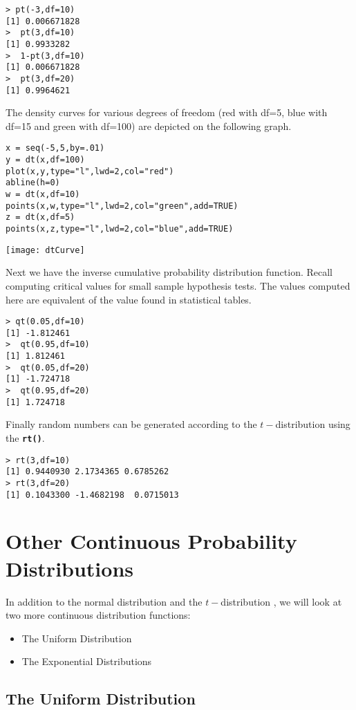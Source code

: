 \documentclass[a4paper,12pt]{article}
\begin{document}
\begin{verbatim}
> pt(-3,df=10)
[1] 0.006671828
>  pt(3,df=10)
[1] 0.9933282
>  1-pt(3,df=10)
[1] 0.006671828
>  pt(3,df=20)
[1] 0.9964621
\end{verbatim}
The density curves for various degrees of freedom (red with df=5, blue with df=15 and green with df=100) are depicted on the following graph.
\begin{framed}
\begin{verbatim}
x = seq(-5,5,by=.01)
y = dt(x,df=100) 
plot(x,y,type="l",lwd=2,col="red")
abline(h=0)
w = dt(x,df=10) 
points(x,w,type="l",lwd=2,col="green",add=TRUE)
z = dt(x,df=5) 
points(x,z,type="l",lwd=2,col="blue",add=TRUE)
\end{verbatim}
\end{framed}
 \begin{center}
 \texttt{[image: dtCurve]}
 \end{center}
Next we have the inverse cumulative probability distribution function. Recall computing critical values for small sample hypothesis tests. The values computed here are equivalent of the value found in statistical tables.

\begin{verbatim}
> qt(0.05,df=10)
[1] -1.812461
>  qt(0.95,df=10)
[1] 1.812461
>  qt(0.05,df=20)
[1] -1.724718
>  qt(0.95,df=20)
[1] 1.724718
\end{verbatim}
Finally random numbers can be generated according to the $t-$distribution using the \textbf{\texttt{rt()}}.
\begin{verbatim}
> rt(3,df=10)
[1] 0.9440930 2.1734365 0.6785262
> rt(3,df=20)
[1] 0.1043300 -1.4682198  0.0715013
\end{verbatim}


\newpage
\section{Other Continuous Probability Distributions}
In addition to the normal distribution and the $t-$distribution , we will look at two more continuous distribution functions: 
\begin{itemize}
\item The Uniform Distribution
\item The Exponential Distributions
\end{itemize}
\subsection{The Uniform Distribution}
\end{document}
